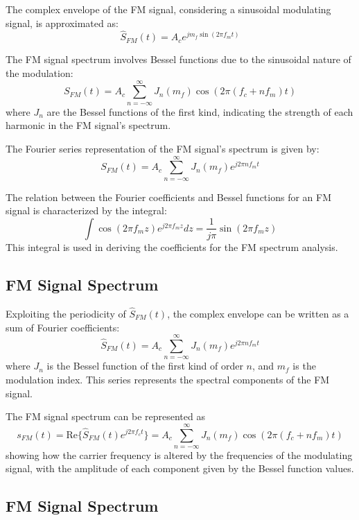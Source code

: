 The complex envelope of the FM signal, considering a sinusoidal modulating signal, is approximated as:
\[
\hat{S}_{FM}(t) = A_c e^{j m_f \sin(2\pi f_m t)}
\]

The FM signal spectrum involves Bessel functions due to the sinusoidal nature of the modulation:
\[
S_{FM}(t) = A_c \sum_{n=-\infty}^{\infty} J_n(m_f) \cos(2\pi (f_c + nf_m)t)
\]
where \( J_n \) are the Bessel functions of the first kind, indicating the strength of each harmonic in the FM signal's spectrum.

The Fourier series representation of the FM signal's spectrum is given by:
\[
S_{FM}(t) = A_c \sum_{n=-\infty}^{\infty} J_n(m_f) e^{j 2\pi n f_m t}
\]

The relation between the Fourier coefficients and Bessel functions for an FM signal is characterized by the integral:
\[
\int \cos(2\pi f_m z) e^{j 2\pi f_m z} dz = \frac{1}{j \pi} \sin(2\pi f_m z)
\]
This integral is used in deriving the coefficients for the FM spectrum analysis.





\subsection*{FM Signal Spectrum}

Exploiting the periodicity of \( \hat{S}_{FM}(t) \), the complex envelope can be written as a sum of Fourier coefficients:
\[
\hat{S}_{FM}(t) = A_c \sum_{n=-\infty}^{\infty} J_n(m_f) e^{j 2\pi n f_m t}
\]
where \( J_n \) is the Bessel function of the first kind of order \( n \), and \( m_f \) is the modulation index. This series represents the spectral components of the FM signal.

The FM signal spectrum can be represented as
\[
s_{FM}(t) = \text{Re}\{ \hat{S}_{FM}(t) e^{j 2\pi f_c t} \} = A_c \sum_{n=-\infty}^{\infty} J_n(m_f) \cos(2\pi (f_c + n f_m) t)
\]
showing how the carrier frequency is altered by the frequencies of the modulating signal, with the amplitude of each component given by the Bessel function values.


\subsection*{FM Signal Spectrum}

